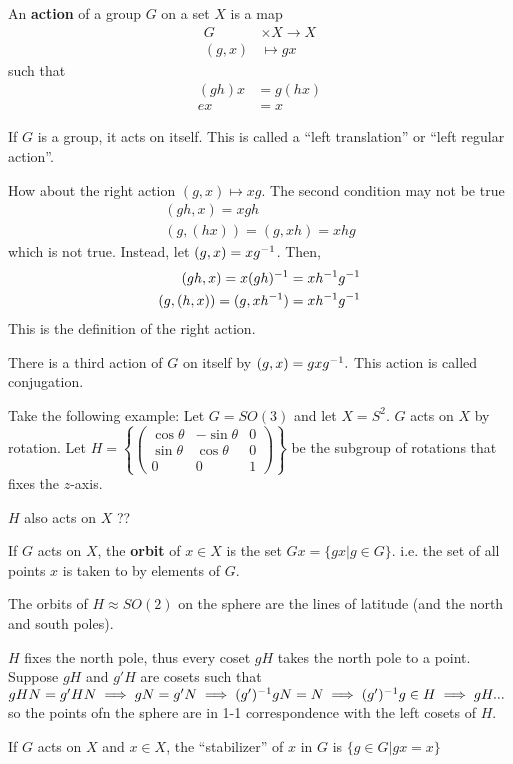\documentclass[a4paper]{article}
\begin{document}
\begin{definition}[Action]
    An \textbf{action} of a group $G$ on a set $X$ is a map \begin{align}
        G&\times X\to X \\
        (g,x)&\mapsto gx
    \end{align}
    such that 
    \begin{align}
        (gh)x&=g(hx)\\
        ex&=x
    \end{align}
\end{definition}

If $G$ is a group, it acts on itself. This is called a ``left translation'' or ``left regular action''.

How about the right action $(g,x)\mapsto xg$. The second condition may not be true\begin{align}
    (gh,x)=xgh\\
    (g,(hx))=(g,xh)=xhg
\end{align} which is not true. Instead, let $(g,x)=xg^{-1}$. Then,
\begin{align}
    (gh,x)=x(gh)^{-1}=xh^{-1} g^{-1}\\
    (g,(h,x))=(g,xh^{-1})=xh^{-1} g^{-1}
\end{align}
This is the definition of the right action.

There is a third action of $G$ on itself by $(g,x)=gxg^{-1}.$ This action is called conjugation.

Take the following example: Let $G=SO(3)$ and let $X=S^2$. $G$ acts on $X$ by rotation. Let $H=\left\{\begin{pmatrix}
    \cos\theta & -\sin\theta & 0\\
    \sin\theta & \cos\theta & 0\\
    0 & 0 & 1
\end{pmatrix}\right\}$ be the subgroup of rotations that fixes the $z$-axis. 

$H$ also acts on $X$ ??
\begin{definition}[Orbit]
    If $G$ acts on $X$, the \textbf{orbit} of $x\in X$ is the set $Gx=\{gx|g\in G\}$. i.e. the set of all points $x$ is taken to by elements of $G$.
\end{definition}

The orbits of $H\approx SO(2)$ on the sphere are the lines of latitude (and the north and south poles). 

$H$ fixes the north pole, thus every coset $gH$ takes the north pole to a point. Suppose $gH$ and $g'H$ are cosets such that $gHN=g'HN\implies gN=g'N\implies (g')^{-1} gN=N\implies (g')^{-1} g\in H\implies gH...$ so the points ofn the sphere are in 1-1 correspondence with the left cosets of $H$. 
\begin{definition}[Stabilizer]
    If $G$ acts on $X$ and $x\in X$, the ``stabilizer'' of $x$ in $G$ is $\{g\in G|gx=x\}$
\end{definition}
\end{document}
